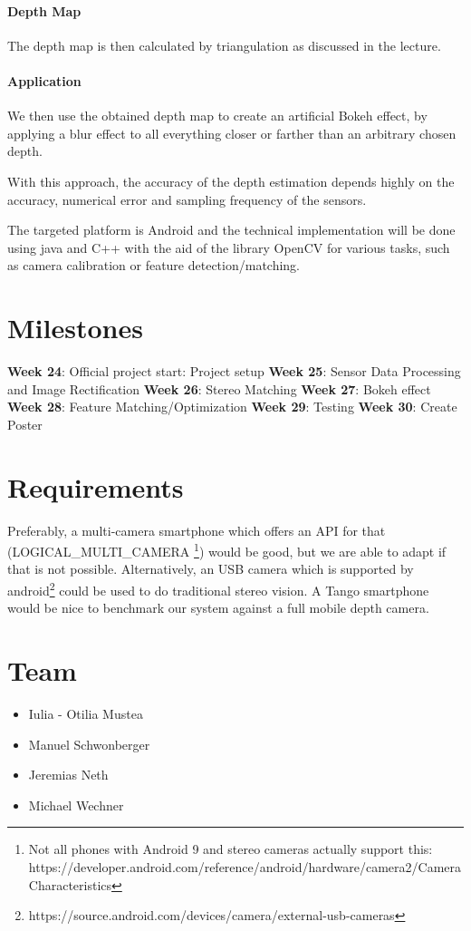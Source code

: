 \documentclass[a4paper,pagesize 10pt]{scrartcl}
\begin{document}
\paragraph{Depth Map}
The depth map is then calculated by triangulation as discussed in the lecture.
\paragraph{Application}
We then use the obtained depth map to create an artificial Bokeh effect, by applying a blur effect to all everything closer or farther than an arbitrary chosen depth.


With this approach, the accuracy of the depth estimation depends highly on the accuracy, numerical error and sampling frequency of the sensors.

The targeted platform is Android and the technical implementation will be done using java and C++ with the aid of the library OpenCV for various tasks, such as camera calibration or feature detection/matching.

%
%
\section{Milestones}
\textbf{Week 24}: Official project start: Project setup
\textbf{Week 25}: Sensor Data Processing and Image Rectification
\textbf{Week 26}: Stereo Matching 
\textbf{Week 27}: Bokeh effect
\textbf{Week 28}: Feature Matching/Optimization 
\textbf{Week 29}: Testing
\textbf{Week 30}: Create Poster
\section{Requirements}
Preferably, a multi-camera smartphone which offers an API for that (LOGICAL_MULTI_CAMERA \footnote{Not all phones with Android 9 and stereo cameras actually support this: https://developer.android.com/reference/android/hardware/camera2/CameraCharacteristics}) would be good, but we are able to adapt if that is not possible. Alternatively, an USB camera which is supported by android\footnote{https://source.android.com/devices/camera/external-usb-cameras} could be used to do traditional stereo vision. A Tango smartphone would be nice to benchmark our system against a full mobile depth camera.
\section{Team}
\begin{itemize}
	\item Iulia - Otilia Mustea
	\item Manuel Schwonberger
	\item Jeremias Neth
	\item Michael Wechner
\end{itemize}


{\small
	
	
}
\end{document}

